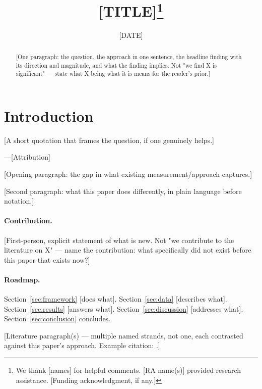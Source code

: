 \documentclass[12pt]{article}
\title{[TITLE]\thanks{We thank [names] for helpful comments. [RA name(s)] provided
  research assistance. [Funding acknowledgment, if any.]}}
\date{[DATE]}
\begin{document}
\maketitle
\thispagestyle{empty}

\begin{abstract}
[One paragraph: the question, the approach in one sentence, the headline finding with its
direction and magnitude, and what the finding implies. Not "we find X is significant" —
state what X being what it is means for the reader's prior.]
\end{abstract}

\section{Introduction}
\label{sec:intro}

\epigraph{[A short quotation that frames the question, if one genuinely helps.]}{---[Attribution]}

[Opening paragraph: the gap in what existing measurement/approach captures.]

[Second paragraph: what this paper does differently, in plain language before notation.]

\paragraph{Contribution.} [First-person, explicit statement of what is new. Not "we
contribute to the literature on X" — name the contribution: what specifically did not exist
before this paper that exists now?]

\paragraph{Roadmap.} Section~\ref{sec:framework} [does what]. Section~\ref{sec:data}
[describes what]. Section~\ref{sec:results} [answers what]. Section~\ref{sec:discussion}
[addresses what]. Section~\ref{sec:conclusion} concludes.

[Literature paragraph(s) — multiple named strands, not one, each contrasted against this
paper's approach. Example citation: \citep{example2024}.]
\end{document}

